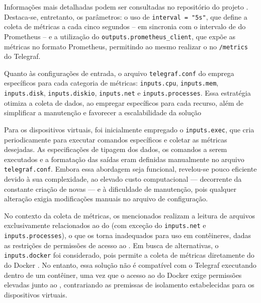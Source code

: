 Informações mais detalhadas podem ser consultadas no repositório do projeto \citep{vitorcossetti2025}. Destaca-se, entretanto, os parâmetros: o uso de \verb|interval = "5s"|, que define a coleta de métricas a cada cinco segundos -- em sincronia com o intervalo de  do Prometheus -- e a utilização do  \verb|outputs.prometheus_client|, que expõe as métricas no formato Prometheus, permitindo ao mesmo realizar o  no  \verb|/metrics| do Telegraf.

Quanto às configurações de entrada, o arquivo \verb|telegraf.conf| do  emprega  específicos para cada categoria de métricas: \verb|inputs.cpu|, \verb|inputs.mem|, \verb|inputs.disk|, \verb|inputs.diskio|, \verb|inputs.net| e \verb|inputs.processes|. Essa estratégia otimiza a coleta de dados, ao empregar  específicos para cada recurso, além de simplificar a manutenção e favorecer a escalabilidade da solução

Para os dispositivos virtuais, foi inicialmente empregado o  \verb|inputs.exec|, que cria  periodicamente para executar comandos específicos e coletar as métricas desejadas. As especificações de tipagem dos dados, os comandos a serem executados e a formatação das saídas eram definidas manualmente no arquivo \verb|telegraf.conf|. Embora essa abordagem seja funcional, revelou-se pouco eficiente devido à sua complexidade, ao elevado custo computacional --- decorrente da constante criação de novas  --- e à dificuldade de manutenção, pois qualquer alteração exigia modificações manuais no arquivo de configuração.

No contexto da coleta de métricas, os  mencionados realizam a leitura de arquivos exclusivamente relacionados ao  do  (com exceção do \verb|inputs.net| e \verb|inputs.processes|), o que os torna inadequados para uso em contêineres, dadas as restrições de permissões de acesso ao . Em busca de alternativas, o  \verb|inputs.docker| foi considerado, pois permite a coleta de métricas diretamente do  do Docker . No entanto, essa solução não é compatível com o Telegraf executando dentro de um contêiner, uma vez que o acesso ao  do Docker exige permissões elevadas junto ao , contrariando as premissas de isolamento estabelecidas para os dispositivos virtuais.

